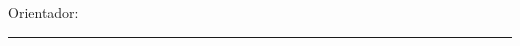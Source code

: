 \begin{folhaderosto}
\thispagestyle{empty} %

\begin{center}
    {\ABNTEXchapterfont\bfseries\large\imprimirautor}
\end{center}

\vspace{5cm} %

\begin{center}
    {\ABNTEXchapterfont\bfseries\large\imprimirtitulo}
\end{center}

\vspace{2.5cm} %

\begin{flushright}
    \begin{minipage}{0.5\textwidth}
        \SingleSpacing
        \imprimirpreambulo
    \end{minipage}
\end{flushright}

\vspace{2.5cm} %

\begin{center}
    Orientador: \imprimirorientador
    
    \vspace{1.2cm} %
    
    \rule{8cm}{0.15mm}
\end{center}

\vspace*{\fill} %

\begin{center}
    {\large\imprimirlocal}
    \par
    {\large\imprimirdata}
\end{center}

\end{folhaderosto}
